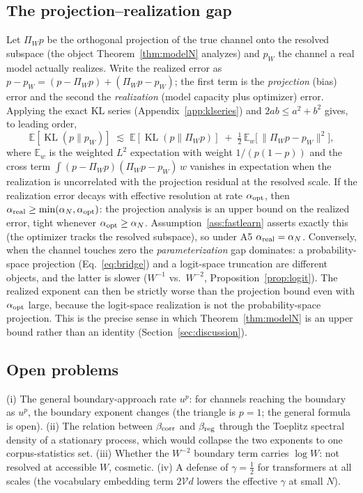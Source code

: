 \documentclass[12pt]{article}
\newcommand{\KL}{\operatorname{KL}}
\newcommand{\E}{\mathbb{E}}
\theoremstyle{remark}
\begin{document}
\subsection{The projection--realization gap}
\label{app:gap}
Let $\Pi_W p$ be the orthogonal projection of the true channel onto the
resolved subspace (the object Theorem~\ref{thm:modelN} analyzes) and $p_W$ the
channel a real model actually realizes. Write the realized error as
$p-p_W=(p-\Pi_W p)+(\Pi_W p-p_W)$; the first term is the
\emph{projection} (bias) error and the second the \emph{realization} (model
capacity plus optimizer) error. Applying the exact KL series
(Appendix~\ref{app:klseries}) and $2ab\le a^2+b^2$ gives, to leading order,
\begin{equation*}
  \E[\KL(p\|p_W)]
  \;\lesssim\;\E[\KL(p\|\Pi_W p)]\;+\;\tfrac12\,\E_w\bigl[\,\|\Pi_W
  p-p_W\|^2\bigr],
\end{equation*}
where $\E_w$ is the weighted $L^2$ expectation with weight
$1/(p(1-p))$ and the cross term $\int (p-\Pi_Wp)(\Pi_Wp-p_W)\,w$ vanishes in
expectation when the realization is uncorrelated with the projection residual
at the resolved scale. If the realization error decays with effective
resolution at rate $\alpha_{\rm opt}$, then
$\alpha_{\rm real}\ge\min(\alpha_N,\alpha_{\rm opt})$: the projection
analysis is an upper bound on the realized error, tight whenever
$\alpha_{\rm opt}\ge\alpha_N$. Assumption~\ref{ass:fastlearn} asserts exactly
this (the optimizer tracks the resolved subspace), so under A5
$\alpha_{\rm real}=\alpha_N$. Conversely, when the channel touches zero the
\emph{parameterization} gap dominates: a probability-space projection
(Eq.~\ref{eq:bridge}) and a logit-space truncation are different objects, and
the latter is slower ($W^{-1}$ vs.\ $W^{-2}$, Proposition~\ref{prop:logit}).
The realized exponent can then be strictly worse than the projection bound
even with $\alpha_{\rm opt}$ large, because the logit-space realization is not
the probability-space projection. This is the precise sense in which
Theorem~\ref{thm:modelN} is an upper bound rather than an identity
(Section~\ref{sec:discussion}).

\subsection{Open problems}
\label{app:open}
(i) The general boundary-approach rate $u^p$: for channels reaching the
boundary as $u^p$, the boundary exponent changes (the triangle is $p=1$; the
general formula is open). (ii) The relation between $\beta_{\rm corr}$ and
$\beta_{\rm reg}$ through the Toeplitz spectral density of a stationary
process, which would collapse the two exponents to one corpus-statistics set.
(iii) Whether the $W^{-2}$ boundary term carries $\log W$: not resolved at
accessible $W$, cosmetic. (iv) A defense of $\gamma=\frac12$ for transformers
at all scales (the vocabulary embedding term $2\mathcal{V}d$ lowers the
effective $\gamma$ at small $N$).
\end{document}
